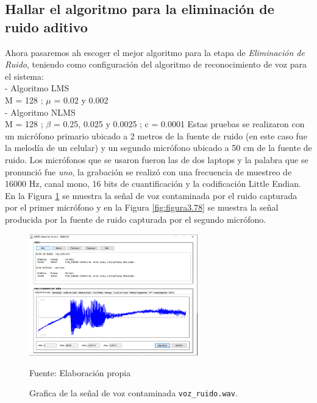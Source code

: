 \subsection{Hallar el algoritmo para la eliminación de ruido aditivo}
Ahora pasaremos ah escoger el mejor algoritmo para la etapa de \textit{Eliminación de Ruido}, teniendo como configuración del algoritmo de reconocimiento de voz para el sistema: \\
- Algoritmo LMS\\
\hspace*{1cm} M = 128 ; \qquad $\mu$ = 0.02 y 0.002\\
- Algoritmo NLMS \\
\hspace*{1cm} M = 128 ; \qquad $\beta$ = 0.25, 0.025 y 0.0025 ; \qquad c = 0.0001
\vskip 0.5cm
Estas pruebas se realizaron con un micrófono primario ubicado a 2 metros de la fuente de ruido (en este caso fue la melodía de un celular) y un segundo micrófono ubicado a 50 cm de la fuente de ruido. Los micrófonos que se usaron fueron las de dos laptops y la palabra que se pronunció fue \textit{uno}, la grabación se realizó con una frecuencia de muestreo de 16000 Hz, canal mono, 16 bits de cuantificación y la codificación Little Endian.
\vskip 0.5cm
En la Figura \ref{fig:figura3.77} se muestra la señal de voz contaminada por el ruido capturada por el primer micrófono y en la Figura \ref{fig:figura3.78} se muestra la señal producida por la fuente de ruido capturada por el segundo micrófono.

\begin{figure}[H]
\begin{center}
\includegraphics[width=0.65\textwidth]{Imagenes/Cap3/image077}
\end{center}
\begin{center}
\vskip -0.5cm
\caption{\small{Grafica de la señal de voz contaminada \texttt{voz\_ruido.wav}.}}
\label{fig:figura3.77}
{\small{Fuente: Elaboración propia}}
\end{center}
\end{figure}

